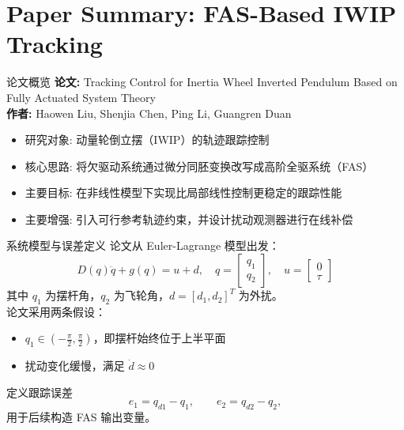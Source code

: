 \section{Paper Summary: FAS-Based IWIP Tracking}

\begin{frame}{论文概览}
    \small
    \textbf{论文:} Tracking Control for Inertia Wheel Inverted Pendulum Based on Fully Actuated System Theory\\[0.4em]
    \textbf{作者:} Haowen Liu, Shenjia Chen, Ping Li, Guangren Duan\\[0.6em]
    \begin{itemize}
        \setlength{\itemsep}{0.45em}
        \item 研究对象: 动量轮倒立摆（IWIP）的轨迹跟踪控制
        \item 核心思路: 将欠驱动系统通过微分同胚变换改写成高阶全驱系统（FAS）
        \item 主要目标: 在非线性模型下实现比局部线性控制更稳定的跟踪性能
        \item 主要增强: 引入可行参考轨迹约束，并设计扰动观测器进行在线补偿
    \end{itemize}
\end{frame}

\begin{frame}{系统模型与误差定义}
    \small
    论文从 Euler-Lagrange 模型出发：
    \[
    D(q)\ddot q + g(q) = u + d,
    \quad
    q = \begin{bmatrix} q_1 \\ q_2 \end{bmatrix},
    \quad
    u = \begin{bmatrix} 0 \\ \tau \end{bmatrix}
    \]
    其中 $q_1$ 为摆杆角，$q_2$ 为飞轮角，$d=[d_1,d_2]^T$ 为外扰。\\[0.5em]
    论文采用两条假设：
    \begin{itemize}
        \setlength{\itemsep}{0.4em}
        \item $q_1 \in \left(-\frac{\pi}{2}, \frac{\pi}{2}\right)$，即摆杆始终位于上半平面
        \item 扰动变化缓慢，满足 $\dot d \approx 0$
    \end{itemize}
    定义跟踪误差
    \[
    e_1 = q_{d1} - q_1,
    \qquad
    e_2 = q_{d2} - q_2,
    \]
    用于后续构造 FAS 输出变量。
\end{frame}

